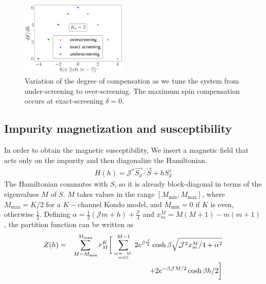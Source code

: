 \documentclass[reprint,prb,superscriptaddress]{revtex4-1}
\begin{document}
\begin{figure}[htpb]
	\centering
	\includegraphics[width=0.45\textwidth]{plt/deg_of_comp.pdf}
	\caption{Variation of the degree of compensation as we tune the system from under-screening to over-screening. The maximum spin compensation occurs at exact-screening \(\delta=0\).}
\end{figure}

\subsection{Impurity magnetization and susceptibility}
\label{sec:imp_suscept}
In order to obtain the magnetic susceptibility, We insert a magnetic field that acts only on the impurity and then diagonalize the Hamiltonian.
\begin{align}
	\label{stargraph_field_hamiltonian}
	H(h) = {\mathcal{J}^*} \vec{S_d}\cdot\vec{S} + h S_d^z
\end{align}
The Hamiltonian commutes with \(S\), so it is already block-diagonal in terms of the eigenvalues \(M\) of \(S\). \(M\) takes values in the range \(\left[M_\text{min}, M_\text{max}\right]\), where \(M_\text{max} = K/2\) for a \(K-\)channel Kondo model, and \(M_\text{min} = 0\)  if \(K\) is even, otherwise \(\frac{1}{2}\). Defining \(\alpha = \frac{1}{2}\left({\mathcal{J}}m + h\right) + \frac{{\mathcal{J}}}{4}\) and \(x^M_m = M(M+1) - m(m+1)\), the partition function can be written as
\begin{eqnarray}
Z(h) &=&\sum_{M=M_\text{min}}^{M_\text{max}}r^K_M\bigg[\sum_{m=-M, \atop{m\in \mathbb{Z}}}^{M-1}2e^{\beta \frac{{\mathcal{J}}}{4}}\cosh \beta\sqrt{{\mathcal{J}}^2x^M_m/4 + \alpha^2} \nonumber\\
&&\hspace{2cm}+ 2e^{-\beta {\mathcal{J}}M/2}\cosh \beta h/2\bigg]
\end{eqnarray}
\end{document}
